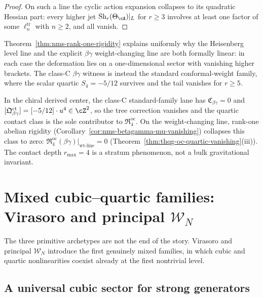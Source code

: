 \begin{proof}
On such a line the cyclic action expansion collapses to its quadratic Hessian part: every higher jet $\mathrm{Sh}_r(\Theta_{\cA})|_L$ for $r \ge 3$ involves at least one factor of some $\ell_n^{\mathrm{tr}}$ with $n \ge 2$, and all vanish.\qedhere
\end{proof}

\begin{remark}
\label{rem:nms-uniform-linearity}
Theorem~\ref{thm:nms-rank-one-rigidity} explains uniformly why the
Heisenberg level line and the explicit $\beta\gamma$ weight-changing
line are both formally linear: in each case the deformation lies on a
one-dimensional sector with vanishing higher brackets. The class-C
$\beta\gamma$ witness is instead the standard conformal-weight family,
where the scalar quartic $S_4=-5/12$ survives and the tail vanishes for
$r\ge5$.
\end{remark}

\begin{remark}
\label{rem:nms-betagamma-derived-center}
In the chiral derived center, the class-C standard-family lane has
$\mathfrak{C}_{\beta\gamma}=0$ and
$[\mathfrak{Q}^{\mathrm{ct}}_{\beta\gamma}]
=[-5/12]\cdot u^4\in\cZ^2$, so the tree correction vanishes and the
quartic contact class is the sole contributor to
$\mathfrak{R}^{\mathrm{oc}}_4$.
On the weight-changing line, rank-one abelian rigidity
(Corollary~\ref{cor:nms-betagamma-mu-vanishing}) collapses this
class to zero:
$\mathfrak{R}^{\mathrm{oc}}_4(\beta\gamma)|_{\text{wt-line}} = 0$
(Theorem~\ref{thm:thqg-oc-quartic-vanishing}(iii)).
The contact depth $r_{\max} = 4$ is a stratum phenomenon, not a bulk
gravitational invariant.
\end{remark}

\section{Mixed cubic--quartic families: Virasoro and principal \texorpdfstring{$\mathcal W_N$}{WN}}
\label{sec:nms-mixed-families}

The three primitive archetypes are not the end of the story. Virasoro and principal $\mathcal W_N$ introduce the first genuinely mixed families, in which cubic and quartic nonlinearities coexist already at the first nontrivial level.

\subsection{A universal cubic sector for strong generators}
\label{subsec:nms-universal-cubic-sector}

